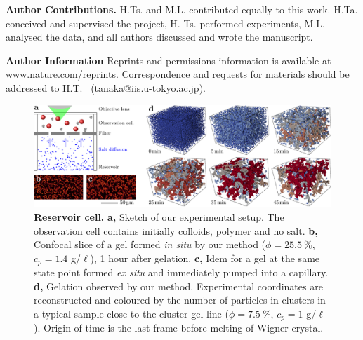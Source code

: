 \documentclass[preprint,footinbib,amsmath,amssymb]{revtex4}
\begin{document}
\noindent
{\bf Author Contributions.} H.Ts. and M.L. contributed equally to this work. 
H.Ta. conceived and supervised the project, H. Ts. performed experiments, M.L. analysed the data, and all authors discussed and wrote the manuscript. 

\noindent
{\bf Author Information} Reprints and permissions information is available at www.nature.com/reprints.
Correspondence and requests for materials should be addressed to H.T. ~(tanaka@iis.u-tokyo.ac.jp).

\clearpage
\begin{figure}
	\includegraphics{figs/cell_vs_cap2.pdf}
	\caption{\textbf{Reservoir cell.} \textbf{a,} Sketch of our experimental setup. The observation cell contains initially colloids, polymer and no salt. \textbf{b,} Confocal slice of a gel formed \textit{in situ} by our method ($\phi=25.5~\%$, $c_p=1.4$ g/$\ell$), 1 hour after gelation. \textbf{c,} Idem for a gel at the same state point formed \textit{ex situ} and immediately pumped into a capillary. \textbf{d,} Gelation observed by our method. Experimental coordinates are reconstructed and coloured by the number of particles in clusters in a typical sample close to the cluster-gel line ($\phi=7.5~\%$, $c_p=1$ g/$\ell$). Origin of time is the last frame before melting of Wigner crystal.
	}
	\label{fig:cell_vs_cap}
\end{figure}
\end{document}
